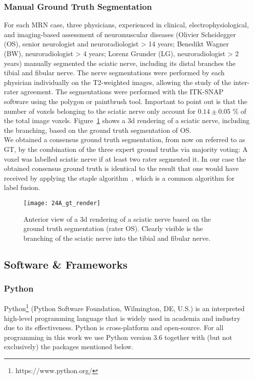 \subsubsection{Manual Ground Truth Segmentation} \label{dataset_gt}
For each MRN case, three physicians, experienced in clinical, electrophysiological, and imaging-based assessment of neuromuscular diseases (Olivier Scheidegger (OS), senior neurologist and neuroradiologist > 14 years; Benedikt Wagner (BW), neuroradiologist > 4 years; Lorenz Grunder (LG), neuroradiologist > 2 years) manually segmented the sciatic nerve, including its distal branches the tibial and fibular nerve. The nerve segmentations were performed by each physician individually on the T2-weighted images, allowing the study of the inter-rater agreement. The segmentations were performed with the ITK-SNAP~\cite{py06nimg} software using the polygon or paintbrush tool. Important to point out is that the number of voxels belonging to the sciatic nerve only account for $0.14 \pm 0.05$ \% of the total image voxels. Figure~\ref{fig:gt_render} shows a \gls{3d} rendering of a sciatic nerve, including the branching, based on the ground truth segmentation of OS.\\
We obtained a consensus ground truth segmentation, from now on referred to as GT, by the combination of the three expert ground truths via majority voting: A voxel was labelled sciatic nerve if at least two rater segmented it. In our case the obtained consensus ground truth is identical to the result that one would have received by applying the \gls{staple} algorithm~\cite{Warfield2004SimultaneousSTAPLE}, which is a common algorithm for label fusion.\\

\begin{figure}[htbp]
	\texttt{[image: 24A\_gt\_render]}
    \caption[Ground Truth Rendering]{Anterior view of a \gls{3d} rendering of a sciatic nerve based on the ground truth segmentation (rater OS). Clearly visible is the branching of the sciatic nerve into the tibial and fibular nerve.}
    \label{fig:gt_render}
\end{figure}


\subsection{Software \& Frameworks}
\subsubsection{Python}
Python\footnote{https://www.python.org/} (Python Software Foundation, Wilmington, DE, U.S.) is an interpreted high-level programming language that is widely used in academia and industry due to its effectiveness. Python is cross-platform and open-source. For all programming in this work we use Python version 3.6 together with (but not exclusively) the packages mentioned below.

